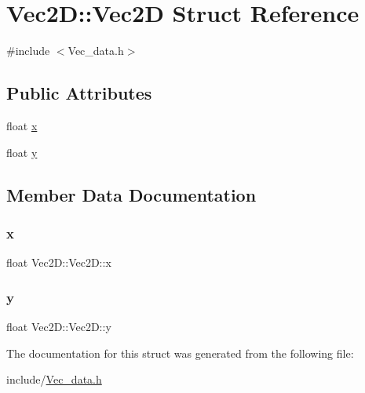 \hypertarget{struct_vec2_d_1_1_vec2_d}{}\section{Vec2D\+:\+:Vec2D Struct Reference}
\label{struct_vec2_d_1_1_vec2_d}


{\ttfamily \#include $<$Vec\+\_\+data.\+h$>$}

\subsection*{Public Attributes}
\begin{DoxyCompactItemize}
\item 
float \mbox{\hyperlink{struct_vec2_d_1_1_vec2_d_a766363392cde1f5f4bd9095f5e019925}{x}}
\item 
float \mbox{\hyperlink{struct_vec2_d_1_1_vec2_d_af5057cbefe925de978c94641959bf0e7}{y}}
\end{DoxyCompactItemize}


\subsection{Member Data Documentation}
\mbox{\label{struct_vec2_d_1_1_vec2_d_a766363392cde1f5f4bd9095f5e019925}} 
\subsubsection{\texorpdfstring{x}{x}}
{\footnotesize\ttfamily float Vec2\+D\+::\+Vec2\+D\+::x}

\mbox{\label{struct_vec2_d_1_1_vec2_d_af5057cbefe925de978c94641959bf0e7}} 
\subsubsection{\texorpdfstring{y}{y}}
{\footnotesize\ttfamily float Vec2\+D\+::\+Vec2\+D\+::y}



The documentation for this struct was generated from the following file\+:\begin{DoxyCompactItemize}
\item 
include/\mbox{\hyperlink{_vec__data_8h}{Vec\+\_\+data.\+h}}\end{DoxyCompactItemize}
